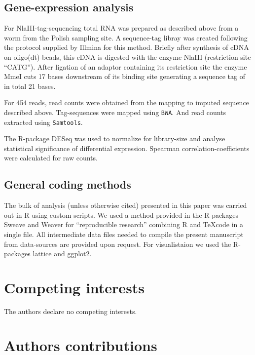 \documentclass[10pt]{bmc_article}
\newenvironment{bmcformat}{\begin{raggedright}\baselineskip20pt\sloppy\setboolean{publ}{false}}{\end{raggedright}\baselineskip20pt\sloppy}
\begin{document}
\begin{bmcformat}
\subsection*{Gene-expression analysis}

For NlaIII-tag-sequencing total RNA was prepared as described above
from a worm from the Polish sampling site. A sequence-tag libray was
created following the protocol supplied by Illmina for this method.
Briefly after synthesis of cDNA on oligo(dt)-beads, this cDNA is
digested with the enzyme NlaIII (restriction site ``CATG''). After
ligation of an adaptor containing its restriction site the enzyme MmeI
cuts 17 bases downstream of its binding site generating a sequence tag
of in total 21 bases.

For 454 reads, read counts were obtained from the mapping to imputed
sequence described above. Tag-sequences were mapped using
\texttt{BWA}\cite{pmid19451168}. And read counts extracted using
\texttt{Samtools}.

The R-package DESeq\cite{pmid20979621} was used to normalize for
library-size and analyse statistical significance of differential
expression. Spearman correlation-coefficients were calculated for raw
counts.

\subsection*{General coding methods}

The bulk of analysis (unless otherwise cited) presented in this paper
was carried out in R \cite{R_project} using custom scripts. We used a
method provided in the R-packages
Sweave\cite{lmucs-papers:Leisch:2002} and Weaver\cite{weaver} for
``reproducible research'' combining R and \TeX code in a single
file. All intermediate data files needed to compile the present
manuscript from data-sources are provided upon request. For
visualistaion we used the R-packages lattice\cite{lattice-book} and
ggplot2\cite{ggplot-book}.


\section*{Competing interests}
The authors declare no competing interests.

\section*{Authors contributions}


\end{bmcformat}
\end{document}
